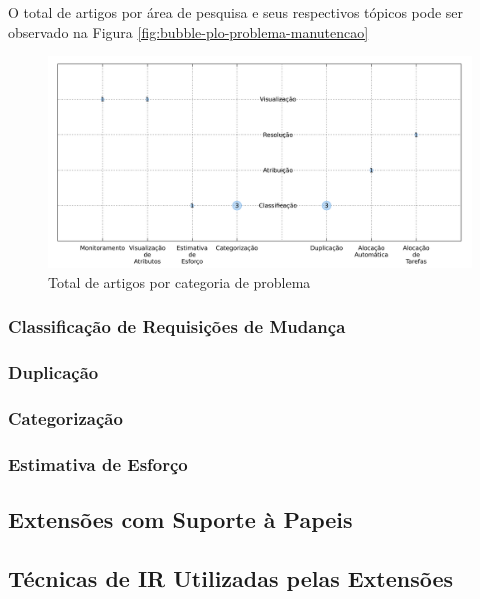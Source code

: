 O total de artigos por área de pesquisa e seus respectivos tópicos pode ser observado na Figura
\ref{fig:bubble-plo-problema-manutencao}



\begin{figure}[htpb]
	\centering
	\includegraphics[width=0.8\linewidth]{./chapter-mapeamento-sistematico/img/bubble-plot-problema-manutencao.pdf}
	\caption{Total de artigos por categoria de problema}
	\label{fig:bubble-plot-problema-manutencao}
\end{figure}
\subsubsection{Classificação de Requisições de Mudança}
\label{ssub:classificação_de_requisições_de_mudança}

\subsubsection{Duplicação}
\subsubsection{Categorização}
\subsubsection{Estimativa de Esforço}



\subsection{Extensões com Suporte à Papeis}
\label{sub:extensões_com_suporte_à_papeis}


\subsection{Técnicas de IR Utilizadas pelas Extensões}
\label{sub:técnicas_de_ir_utilizadaas_pelas_extensões}


